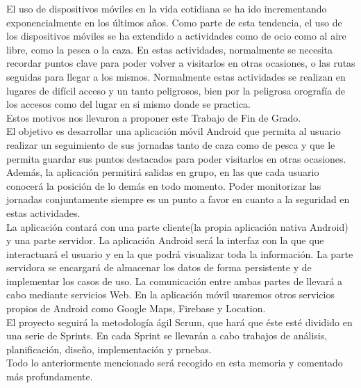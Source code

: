 	El uso de dispositivos móviles en la vida cotidiana se ha ido incrementando exponencialmente en los últimos años. Como parte de esta tendencia, el uso de los dispositivos móviles se ha extendido a actividades como de ocio como al aire libre, como la pesca o la caza. En estas actividades, normalmente se necesita recordar puntos clave para poder volver a visitarlos en otras ocasiones, o las rutas seguidas para llegar a los mismos. Normalmente estas actividades se realizan en lugares de difícil acceso y un tanto peligrosos, bien por la peligrosa orografía de los accesos como del lugar en si mismo donde se practica.\\

Estos motivos nos llevaron a proponer este Trabajo de Fin de Grado.\\


El objetivo es desarrollar una aplicación móvil Android que permita al usuario realizar un seguimiento de sus jornadas tanto de caza como de pesca  y que le permita guardar sus puntos destacados para poder visitarlos en otras ocasiones. Además, la aplicación permitirá salidas en grupo, en las que cada usuario conocerá la posición de lo demás en todo momento. Poder monitorizar las jornadas conjuntamente siempre es un punto a favor en cuanto a la seguridad en estas actividades.\\



 La aplicación contará con una parte cliente(la propia aplicación nativa Android) y una parte servidor. La aplicación Android será la interfaz con la que que interactuará el usuario y en la que podrá visualizar toda la información. La parte servidora se encargará de almacenar los datos de forma persistente y de implementar los casos de uso. La comunicación entre ambas partes de llevará a cabo mediante servicios Web. En la aplicación móvil usaremos otros servicios propios de Android como Google Maps, Firebase y Location.\\



El proyecto seguirá la metodología ágil Scrum, que hará que éste esté dividido en una serie de Sprints. En cada Sprint  se llevarán a cabo trabajos de análisis, planificación, diseño, implementación y pruebas.\\

Todo lo anteriormente mencionado será recogido en esta memoria y comentado más profundamente.






